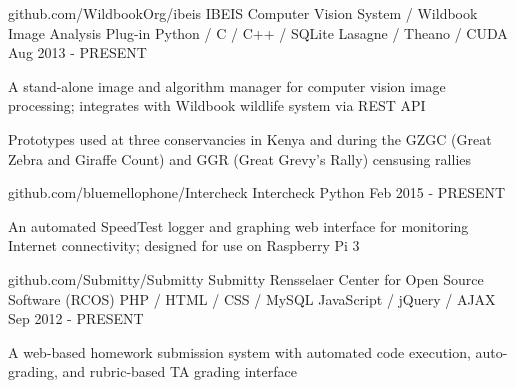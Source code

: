 

\begin{cventries}


  \cventry
    {github.com/WildbookOrg/ibeis} %
    {IBEIS Computer Vision System / Wildbook Image Analysis Plug-in} %
    {Python / C / C++ / SQLite \newline Lasagne / Theano / CUDA} %
    {Aug 2013 - PRESENT} %
    {
      \begin{cvitems} %
        \item {A stand-alone image and algorithm manager for computer vision image processing; integrates with Wildbook wildlife system via REST API}
        \item {Prototypes used at three conservancies in Kenya and during the GZGC (Great Zebra and Giraffe Count) and GGR (Great Grevy's Rally) censusing rallies}
      \end{cvitems}
    }

  \cventry
    {github.com/bluemellophone/Intercheck} %
    {Intercheck} %
    {Python} %
    {Feb 2015 - PRESENT} %
    {
      \begin{cvitems} %
        \item {An automated SpeedTest logger and graphing web interface for monitoring Internet connectivity; designed for use on Raspberry Pi 3}
      \end{cvitems}
    }

  \cventry
    {github.com/Submitty/Submitty} %
    {Submitty \dotSep Rensselaer Center for Open Source Software (RCOS)} %
    {PHP / HTML / CSS / MySQL \newline JavaScript / jQuery / AJAX } %
    {Sep 2012 - PRESENT} %
    {
      \begin{cvitems} %
        \item {A web-based homework submission system with automated code execution, auto-grading, and rubric-based TA grading interface}
      \end{cvitems}
    }


\end{cventries}
